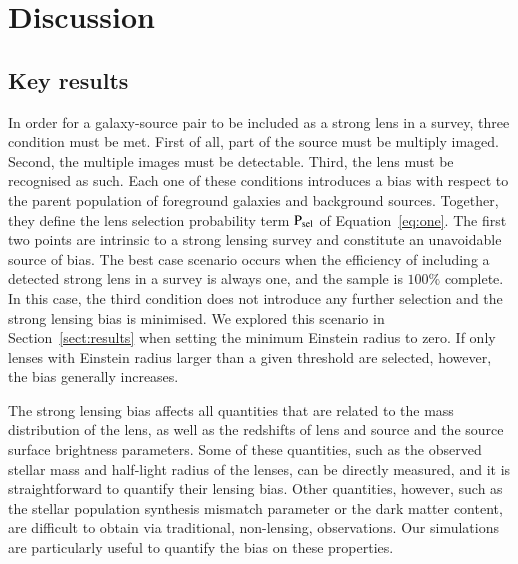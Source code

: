 \documentclass{aa}
\def\psel{{\rm P}_\mathrm{sel}}
\def\Sref#1{Section~\ref{#1}\xspace}
\def\Fref#1{Figure~\ref{#1}\xspace}
\def\Eref#1{Equation~\ref{#1}\xspace}
\begin{document}


\section{Discussion}\label{sect:discuss}

\subsection{Key results}

In order for a galaxy-source pair to be included as a strong lens in a survey, three condition must be met.
First of all, part of the source must be multiply imaged.
Second, the multiple images must be detectable.
Third, the lens must be recognised as such.
Each one of these conditions introduces a bias with respect to the parent population of foreground galaxies and background sources. Together, they define the lens selection probability term $\psel$ of \Eref{eq:one}.
The first two points are intrinsic to a strong lensing survey and constitute an unavoidable source of bias. 
The best case scenario occurs when the efficiency of including a detected strong lens in a survey is always one, and the sample is $100\%$ complete. In this case, the third condition does not introduce any further selection and the strong lensing bias is minimised.
We explored this scenario in \Sref{sect:results} when setting the minimum Einstein radius to zero.
If only lenses with Einstein radius larger than a given threshold are selected, however, the bias generally increases.

The strong lensing bias affects all quantities that are related to the mass distribution of the lens, as well as the redshifts of lens and source and the source surface brightness parameters.
Some of these quantities, such as the observed stellar mass and half-light radius of the lenses, can be directly measured, and it is straightforward to quantify their lensing bias.
Other quantities, however, such as the stellar population synthesis mismatch parameter or the dark matter content, are difficult to obtain via traditional, non-lensing, observations. Our simulations are particularly useful to quantify the bias on these properties.
\end{document}
